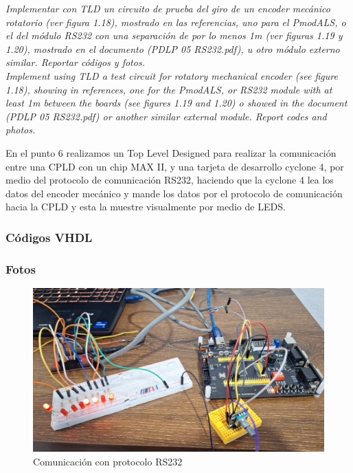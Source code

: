 \textit{\textcolor{Verde}{Implementar con TLD un circuito de prueba del giro de un encoder mecánico rotatorio
(ver figura 1.18), mostrado en las referencias, uno para el PmodALS, o el del módulo
RS232 con una separación de por lo menos 1m (ver figuras 1.19 y 1.20), mostrado en
el documento (PDLP 05 RS232.pdf), u otro módulo externo similar. Reportar códigos
y fotos.\\
Implement using TLD a test circuit for rotatory mechanical encoder (see figure 1.18),
showing in references, one for the PmodALS, or RS232 module with at least 1m between
the boards (see figures 1.19 and 1.20) o showed in the document (PDLP 05 RS232.pdf)
or another similar external module. Report codes and photos.}}


En el punto 6 realizamos un Top Level Designed para realizar la comunicación entre una CPLD con un chip MAX II, y una tarjeta de desarrollo cyclone 4, por medio del protocolo de comunicación RS232, haciendo que la cyclone 4 lea los datos del encoder mecánico y mande los datos por el protocolo de comunicación hacia la CPLD y esta la muestre visualmente por medio de LEDS.\ 

\subsubsection*{Códigos VHDL}











\subsubsection*{Fotos}


\begin{figure}[H]
    \centering
    \includegraphics[width=0.5\linewidth]{Codigos/Encoder.png}
    \caption{Comunicación con protocolo RS232}\label{fig:rs232}
\end{figure}





